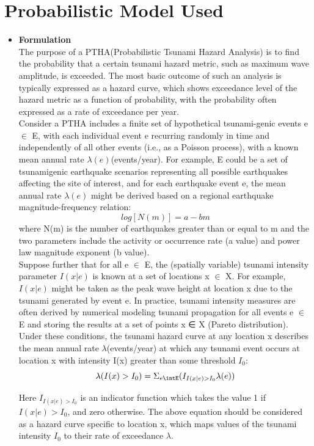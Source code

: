 \documentclass{article}
\begin{document}
\section {Probabilistic Model Used}
\begin{itemize}

\item \large \textbf{Formulation}\\
\normalsize The purpose of a PTHA(Probabilistic Tsunami Hazard Analysis) is to find the probability that a certain tsunami hazard metric, such as maximum wave
amplitude, is exceeded. The most basic outcome of such an analysis is typically expressed as a hazard curve,
which shows exceedance level of the hazard metric as a function of probability, with the probability often
expressed as a rate of exceedance per year.\\

Consider a PTHA includes a finite set of hypothetical tsunami-genic events e $\in$ E, with each individual event e recurring randomly in time and independently of all other events (i.e., as a Poisson process), with a known mean annual rate $\lambda(e)$(events/year). For example, E could be a set of
tsunamigenic earthquake scenarios representing all possible earthquakes affecting the site of interest, and for each earthquake event e, the mean annual rate $\lambda(e)$ might be derived based on a regional earthquake
magnitude-frequency relation: $$log[N(m)]=a-bm$$
where N(m) is the number of earthquakes greater than or equal to m and the two parameters include the activity or occurrence rate (a value) and power law magnitude exponent (b value).\\

Suppose further that for all e $\in$ E, the (spatially variable)
tsunami intensity parameter $I(x|e)$ is known at a set of locations x $\in$ X. For example, $I(x|e)$ might be taken as the peak wave height at location x due to the tsunami generated by event e. In practice, tsunami intensity measures are often derived by numerical modeling tsunami propagation for all events e $\in$ E and storing the results at a set of points x ∈ X (Pareto distribution). Under these conditions, the tsunami hazard curve at any location x describes the mean annual rate $\lambda$(events/year) at which any tsunami event occurs at location x with intensity I(x) greater than
some threshold $I_{0}$:
$$\lambda(I(x)>I_{0})=\Sigma_{e\intE}(I_{I(x|e)>I_{0}}\lambda(e))$$

Here $I_{I(x|e)>I_{0}}$ is an indicator function which takes the value 1 if $I(x|e)>I_{0}$, and zero otherwise. The above equation should be considered as a hazard curve specific to location x, which maps values of the tsunami intensity $I_{0}$ to their rate of exceedance $\lambda$.\\


\end{itemize}
\end{document}
